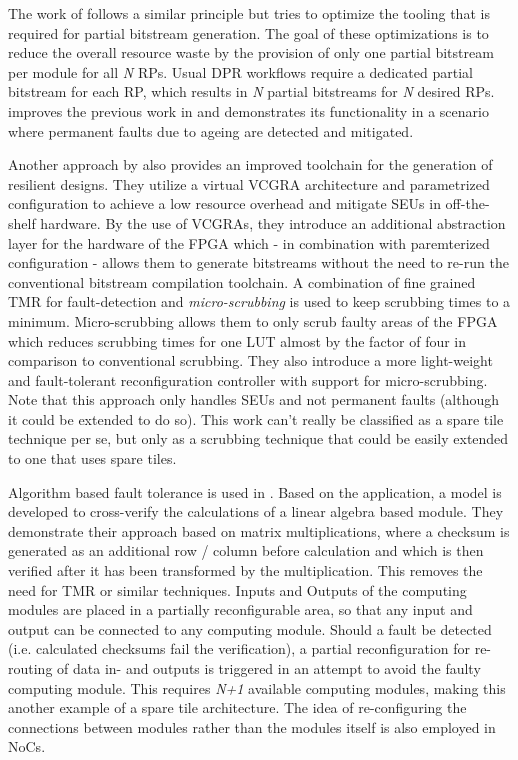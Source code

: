 The work of \cite{martins_tmr_2015} follows a similar principle but tries to optimize the tooling that is required for partial bitstream generation.
The goal of these optimizations is to reduce the overall resource waste by the provision of only one partial bitstream per module for all \textit{N} \glspl{RP}. %
Usual \gls{DPR} workflows require a dedicated partial bitstream for each \gls{RP}, which results in \textit{N} partial bitstreams for \textit{N} desired \glspl{RP}.
\cite{martins_dynamic_2018} improves the previous work in \cite{martins_tmr_2015} and demonstrates its functionality in a scenario where permanent faults due to ageing are detected and mitigated.

Another approach by \cite{kourfali2019} also provides an improved toolchain for the generation of resilient designs. 
They utilize a virtual \gls{VCGRA} architecture and parametrized configuration \cite{heyse2013} to achieve a low resource overhead and mitigate \glspl{SEU} in off-the-shelf hardware.
By the use of \glspl{VCGRA}, they introduce an additional abstraction layer for the hardware of the \gls{FPGA} which - in combination with paremterized configuration - allows them to generate bitstreams without the need to re-run the conventional bitstream compilation toolchain.
A combination of fine grained \gls{TMR} for fault-detection and \textit{micro-scrubbing} is used to keep scrubbing times to a minimum. 
Micro-scrubbing allows them to only scrub faulty areas of the \gls{FPGA} which reduces scrubbing times for one \gls{LUT} almost by the factor of four in comparison to conventional scrubbing.
They also introduce a more light-weight and fault-tolerant reconfiguration controller with support for micro-scrubbing. 
Note that this approach only handles \glspl{SEU} and not permanent faults (although it could be extended to do so).
This work can't really be classified as a spare tile technique per se, but only as a scrubbing technique that could be easily extended to one that uses spare tiles. 

Algorithm based fault tolerance is used in \cite{davis2014}.
Based on the application, a model is developed to cross-verify the calculations of a linear algebra based module. 
They demonstrate their approach based on matrix multiplications, where a checksum is generated as an additional row / column before calculation and which is then verified after it has been transformed by the multiplication.
This removes the need for \gls{TMR} or similar techniques.
Inputs and Outputs of the computing modules are placed in a partially reconfigurable area, so that any input and output can be connected to any computing module.  
Should a fault be detected (i.e. calculated checksums fail the verification), a partial reconfiguration for re-routing of data in- and outputs is triggered in an attempt to avoid the faulty computing module. 
This requires \textit{N+1} available computing modules, making this another example of a spare tile architecture.
The idea of re-configuring the connections between modules rather than the modules itself is also employed in \glspl{NoC}.

